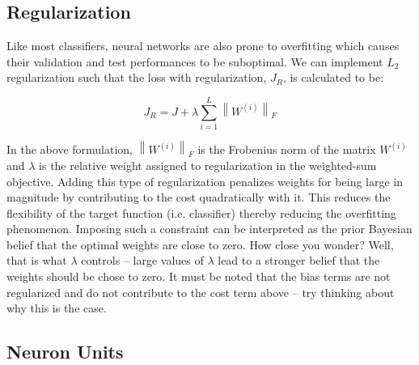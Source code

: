 \documentclass{tufte-handout}
\newcommand{\norm}[1]{\left\lVert#1\right\rVert}
\begin{document}
\subsection{Regularization}

Like most classifiers, neural networks are also prone to overfitting which causes their validation and test performances to be suboptimal. We can implement $L_2$ regularization such that the loss with regularization, $J_R$, is calculated to be:

$$J_R = J + \lambda \sum_{i = 1}^{L} \norm{W^{(i)}}_F$$

In the above formulation, $\norm{W^{(i)}}_F$ is the Frobenius norm of the matrix $W^{(i)}$ and $\lambda$ is the relative weight assigned to regularization in the weighted-sum objective. Adding this type of regularization penalizes weights for being large in magnitude by contributing to the cost quadratically with it. This reduces the flexibility of the target function (i.e. classifier) thereby reducing the overfitting phenomenon. Imposing such a constraint can be interpreted as the prior Bayesian belief that the optimal weights are close to zero. How close you wonder? Well, that is what $\lambda$ controls -- large values of $\lambda$ lead to a stronger belief that the weights should be chose to zero. It must be noted that the bias terms are not regularized and do not contribute to the cost term above -- try thinking about why this is the case.

\subsection{Neuron Units}
\end{document}
